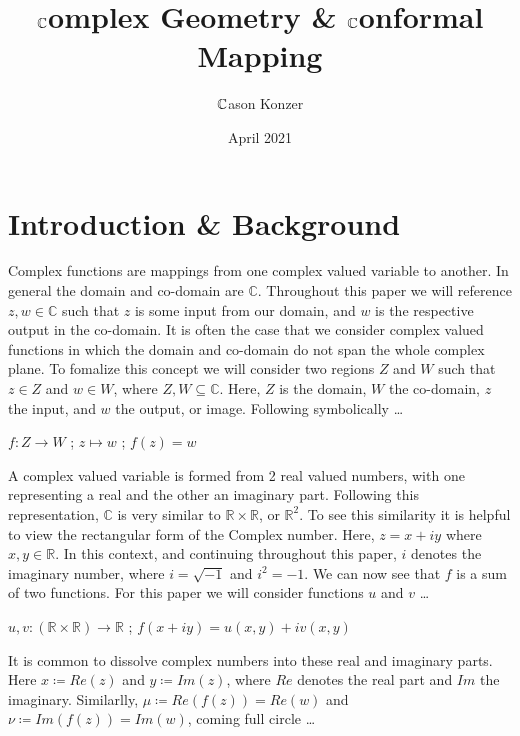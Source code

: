 \documentclass[a4paper,man,natbib]{apa6}
\title{$ \C $omplex Geometry \& $ \C $onformal Mapping}
\author{ $\C $ason Konzer}
\date{April 2021}
\affiliation{University of Michigan}
\newcommand{\C}{\mathbb{C}}  %
\newcommand{\R}{\mathbb{R}}  %
\begin{document}
\maketitle

\section{Introduction \& Background}
\label{sec: Before we Start}

Complex functions are mappings from one complex valued variable to another. In general the domain and co-domain are $ \C $.
Throughout this paper we will reference $ z,w \in \C $ such that $ z $ is some input from our domain, and $ w $ is the respective output in the co-domain.
It is often the case that we consider complex valued functions in which the domain and co-domain do not span the whole complex plane.
To fomalize this concept we will consider two regions $ Z $ and $ W $ such that $ z \in Z $ and $ w \in W $, where $ Z,W \subseteq \C $.
Here, $ Z $ is the domain, $ W $ the co-domain, $ z $ the input, and $ w $ the output, or image. Following symbolically \dots

\begin{center}

      $ f: Z \to W $ ; $ z \mapsto w $ ; $ f(z) = w $

\end{center}



A complex valued variable is formed from 2 real valued numbers, with one representing a real and the other an imaginary part.
Following this representation, $ \C $ is very similar to $ \R \times \R $, or $ \R^2 $.
To see this similarity it is helpful to view the rectangular form of the Complex number. Here, $z = x + iy$ where $x,y \in \R$.
In this context, and continuing throughout this paper, $ i $ denotes the imaginary number, where $ i = \sqrt{-1} $ and $ i^2 = -1 $.
We can now see that $ f $ is a sum of two functions. For this paper we will consider functions $u$ and $v$ \dots

\begin{center}

      $ u,v: (\R \times \R) \to \R $ ; $ f(x+iy) = u(x,y) + iv(x,y) $

\end{center}

It is common to dissolve complex numbers into these real and imaginary parts. Here $ x \coloneqq Re(z) $ and $ y \coloneqq Im(z) $, where $ Re $ denotes the real part and $ Im $ the imaginary.
Similarlly, $ \mu \coloneqq Re(f(z)) = Re(w) $ and $ \nu \coloneqq Im(f(z)) = Im(w) $, coming full circle \dots
\end{document}
